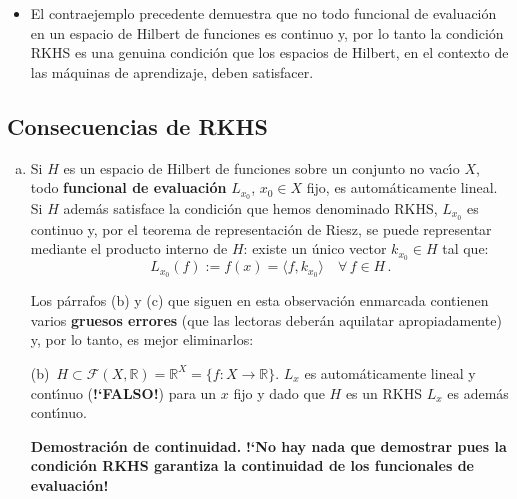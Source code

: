 \begin{enumerate}
\begin{itemize}
\item
El contraejemplo precedente demuestra que no todo funcional de
evaluaci\'on en un espacio de Hilbert de funciones es continuo y,
por lo tanto la condici\'on RKHS es una genuina condici\'on que
los espacios de Hilbert, en el contexto de las m\'aquinas de
aprendizaje, deben satisfacer.
\end{itemize}
\end{enumerate}



\subsection{Consecuencias de RKHS}

\begin{enumerate}[(a)]
\item
Si $H$ es un espacio de Hilbert de funciones sobre un conjunto no
vac\'\i o $X$, todo {\color{red} \bf funcional de evaluaci\'on}
$L_{x_0}$, $x_0\in X$ fijo, es autom\'aticamente lineal.
Si $H$ adem\'as satisface la condici\'on que hemos denominado RKHS,
$L_{x_0}$ es continuo y, por el teorema de representaci\'on de Riesz,
se puede representar mediante el producto interno de $H$:
existe un \'unico vector $k_{x_0}\in H$ tal que:
\begin{equation*}
L_{x_0}(f):= f(x)= \langle f,k_{x_0}\rangle\quad\forall\,f\in H\,.
\end{equation*}

\begin{myremark}
Los p\'arrafos (b) y (c) que siguen en esta observaci\'on enmarcada
contienen varios {\bf gruesos errores} (que las lectoras deber\'an
aquilatar apropiadamente) y, por lo tanto, es mejor eliminarlos:

(b)\ $H\subset\mathcal{F}(X,\mathbb{R})
=\mathbb{R}^X=\{f:X \rightarrow \mathbb{R}\}$. 
$L_x$ es autom\'aticamente lineal y cont\'\i nuo ({\bf !`FALSO!})
para un $x$ fijo y dado que $H$ es un RKHS $L_x$ es adem\'as cont\'\i nuo.

\smallskip\noindent
\textbf{Demostraci\'on de continuidad.}\quad
{\bf !`No hay nada que demostrar pues la condici\'on RKHS garantiza
la continuidad de los funcionales de evaluaci\'on!}


\end{myremark}
\end{enumerate}
